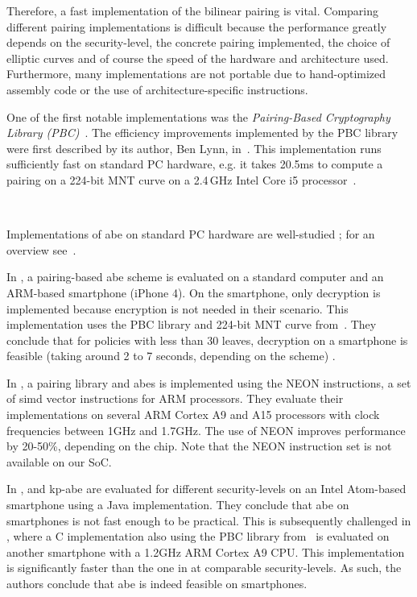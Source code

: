Therefore, a fast implementation of the bilinear pairing is vital.
Comparing different pairing implementations is difficult because the performance greatly depends on the \gls{security-level}, the concrete pairing implemented, the choice of elliptic curves and of course the speed of the hardware and architecture used. 
Furthermore, many implementations are not portable due to hand-optimized assembly code or the use of architecture-specific instructions.

One of the first notable implementations was the \emph{Pairing-Based Cryptography Library (PBC)}~\cite{ben_lynn_pairing-based_nodate, lynn_implementation_2007}.
The efficiency improvements implemented by the PBC library were first described by its author, Ben Lynn, in~\cite{lynn_implementation_2007}.
This implementation runs sufficiently fast on standard PC hardware, e.g. it takes 20.5ms to compute a pairing on a 224-bit MNT curve on a 2.4\,GHz Intel Core i5 processor~\cite{akinyele_self-protecting_2010}.

~

Implementations of \acrshort{abe} on standard PC hardware are well-studied \cite{bethencourt_ciphertext-policy_2007,akinyele_charm_2013,green_functional_nodate}; for an overview see~\cite{zickau_applied_2016}.

In \cite{akinyele_self-protecting_2010}, a pairing-based \acrshort{abe} scheme is evaluated on a standard computer and an ARM-based smartphone (iPhone 4).
On the smartphone, only decryption is implemented because encryption is not needed in their scenario.
This implementation uses the PBC library and 224-bit MNT curve from~\cite{lynn_implementation_2007}.
They conclude that for policies with less than 30 leaves, decryption on a smartphone is feasible (taking around 2 to 7 seconds, depending on the scheme) \cite{akinyele_self-protecting_2010}.

In \cite{sanchez_neon_2013}, a pairing library and \acrshort{abes} is implemented using the NEON instructions, a set of \acrshort{simd} vector instructions for ARM processors.
They evaluate their implementations on several ARM Cortex A9 and A15 processors with clock frequencies between 1GHz and 1.7GHz.
The use of NEON improves performance by 20-50\%, depending on the chip.
Note that the NEON instruction set is not available on our SoC. 

In \cite{wang_performance_2014},  and \acrshort{kp-abe} are evaluated for different \glspl{security-level} on an Intel Atom-based smartphone using a Java implementation.
They conclude that \acrshort{abe} on smartphones is not fast enough to be practical.
This is subsequently challenged in \cite{ambrosin_feasibility_2015}, where a C implementation also using the PBC library from~\cite{lynn_implementation_2007} is evaluated on another smartphone with a 1.2GHz ARM Cortex A9 CPU.
This implementation is significantly faster than the one in \cite{wang_performance_2014} at comparable \glspl{security-level}.
As such, the authors conclude that \acrshort{abe} is indeed feasible on smartphones.

